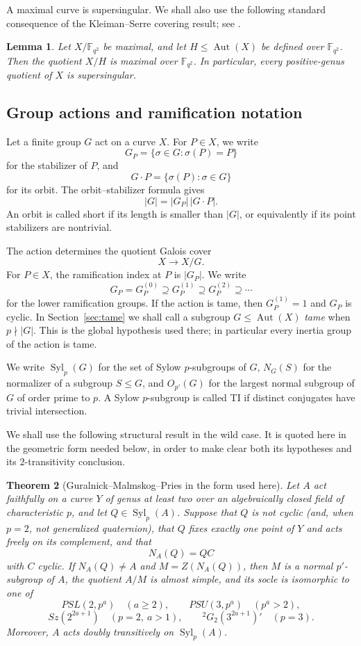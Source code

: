\documentclass[11pt]{amsart}
\newtheorem{theorem}{Theorem}[section]
\newtheorem{lemma}[theorem]{Lemma}
\theoremstyle{remark}
\newcommand{\F}{\mathbb F}
\newcommand{\Aut}{\operatorname{Aut}}
\newcommand{\Syl}{\operatorname{Syl}}
\begin{document}
A maximal curve is supersingular.  We shall also use the following
standard consequence of the Kleiman--Serre covering result; see
\cite[Proposition~6]{Lachaud}.

\begin{lemma}\label{lem:quotientmax}
Let $X/\F_{q^2}$ be maximal, and let $H\leq\Aut(X)$ be defined over
$\F_{q^2}$.  Then the quotient $X/H$ is maximal over $\F_{q^2}$.
In particular, every positive-genus quotient of $X$ is supersingular.
\end{lemma}

\subsection{Group actions and ramification notation}

Let a finite group $G$ act on a curve $X$.  For $P\in X$, we write
\[
        G_P=\{\sigma\in G:\sigma(P)=P\}
\]
for the stabilizer of $P$, and
\[
        G\cdot P=\{\sigma(P):\sigma\in G\}
\]
for its orbit.  The orbit--stabilizer formula gives
\[
        |G|=|G_P|\,|G\cdot P|.
\]
An orbit is called short if its length is smaller than $|G|$, or
equivalently if its point stabilizers are nontrivial.

The action determines the quotient Galois cover
\[
        X\longrightarrow X/G.
\]
For $P\in X$, the ramification index at $P$ is $|G_P|$.  We write
\[
        G_P=G_P^{(0)}\supseteq G_P^{(1)}
             \supseteq G_P^{(2)}\supseteq\cdots
\]
for the lower ramification groups.  If the action is tame, then
$G_P^{(1)}=1$ and $G_P$ is cyclic.  In Section~\ref{sec:tame} we shall
call a subgroup $G\le\Aut(X)$ \emph{tame} when $p\nmid|G|$.  This is
the global hypothesis used there; in particular every inertia group of
the action is tame.

We write $\Syl_p(G)$ for the set of Sylow $p$-subgroups of $G$,
$N_G(S)$ for the normalizer of a subgroup $S\le G$, and
$O_{p'}(G)$ for the largest normal subgroup of $G$ of order prime to
$p$.  A Sylow $p$-subgroup is called TI if distinct conjugates have
trivial intersection.

We shall use the following structural result in the wild case. It is
quoted here in the geometric form needed below, in order to make clear
both its hypotheses and its $2$-transitivity conclusion.

\begin{theorem}[Guralnick--Malmskog--Pries in the form used here]\label{thm:GMP-TI}
Let $A$ act faithfully on a curve $Y$ of genus at least two over an
algebraically closed field of characteristic $p$, and let
$Q\in\Syl_p(A)$. Suppose that $Q$ is not cyclic (and, when $p=2$, not
generalized quaternion), that $Q$ fixes exactly one point of $Y$ and
acts freely on its complement, and that
\[
        N_A(Q)=QC
\]
with $C$ cyclic. If $N_A(Q)\ne A$ and $M=Z(N_A(Q))$, then $M$ is a
normal $p'$-subgroup of $A$, the quotient $A/M$ is almost simple, and
its socle is isomorphic to one of
\[
 PSL(2,p^a)\quad(a\ge2),\qquad
 PSU(3,p^a)\quad(p^a>2),
\]
\[
 Sz(2^{2a+1})\quad(p=2,\ a>1),\qquad
 {}^2G_2(3^{2a+1})'\quad(p=3).
\]
Moreover, $A$ acts doubly transitively on $\Syl_p(A)$.
\end{theorem}
\end{document}
